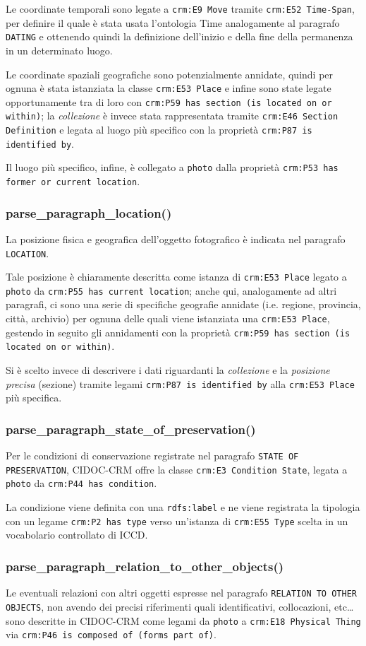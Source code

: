 Le coordinate temporali sono legate a \texttt{crm:E9 Move} tramite \texttt{crm:E52 Time-Span}, per definire il quale è stata usata l'ontologia Time analogamente al paragrafo \texttt{DATING} e ottenendo quindi la definizione dell'inizio e della fine della permanenza in un determinato luogo.

Le coordinate spaziali geografiche sono potenzialmente annidate, quindi per ognuna è stata istanziata la classe \texttt{crm:E53 Place} e infine sono state legate opportunamente tra di loro con \texttt{crm:P59 has section (is located on or within)}; la \emph{collezione} è invece stata rappresentata tramite \texttt{crm:E46 Section Definition} e legata al luogo più specifico con la proprietà \texttt{crm:P87 is identified by}.

Il luogo più specifico, infine, è collegato a \texttt{photo} dalla proprietà \texttt{crm:P53 has former or current location}.

\subsubsection{parse\_paragraph\_location()}
La posizione fisica e geografica dell'oggetto fotografico è indicata nel paragrafo \texttt{LOCATION}.

Tale posizione è chiaramente descritta come istanza di \texttt{crm:E53 Place} legato a \texttt{photo} da \texttt{crm:P55 has current location}; anche qui, analogamente ad altri paragrafi, ci sono una serie di specifiche geografie annidate (i.e. regione, provincia, città, archivio) per ognuna delle quali viene istanziata una \texttt{crm:E53 Place}, gestendo in seguito gli annidamenti con la proprietà \texttt{crm:P59 has section (is located on or within)}.

Si è scelto invece di descrivere i dati riguardanti la \emph{collezione} e la \emph{posizione precisa} (sezione) tramite legami \texttt{crm:P87 is identified by} alla \texttt{crm:E53 Place} più specifica.

\subsubsection{parse\_paragraph\_state\_of\_preservation()}
Per le condizioni di conservazione registrate nel paragrafo \texttt{STATE OF PRESERVATION}, CIDOC-CRM offre la classe \texttt{crm:E3 Condition State}, legata a \texttt{photo} da \texttt{crm:P44 has condition}.

La condizione viene definita con una \texttt{rdfs:label} e ne viene registrata la tipologia con un legame \texttt{crm:P2 has type} verso un'istanza di \texttt{crm:E55 Type} scelta in un vocabolario controllato di ICCD.

\subsubsection{parse\_paragraph\_relation\_to\_other\_objects()}
Le eventuali relazioni con altri oggetti espresse nel paragrafo \texttt{RELATION TO OTHER OBJECTS}, non avendo dei precisi riferimenti quali identificativi, collocazioni, etc\ldots sono descritte in CIDOC-CRM come legami da \texttt{photo} a \texttt{crm:E18 Physical Thing} via \texttt{crm:P46 is composed of (forms part of)}.

